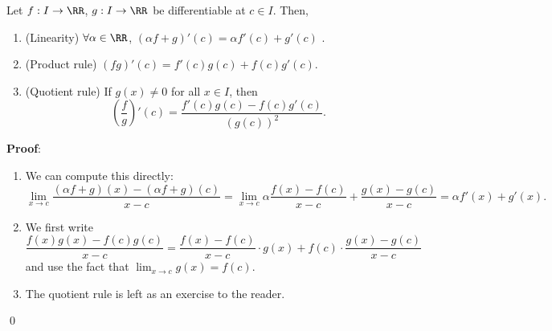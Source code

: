 \begin{theorem}
Let $f: I \to \RR$, $g:I\to \RR$ be differentiable at $c\in I$. Then,
\begin{enumerate}
    \item (Linearity) $\forall \alpha \in \RR$, $(\alpha f+g)'(c) = \alpha f'(c) + g'(c)$ .
    \item (Product rule) $(fg)'(c) = f'(c)g(c) + f(c)g'(c)$.
    \item (Quotient rule) If $g(x)\neq 0$ for all $x\in I$, then 
    \[
    \left(\frac{f}{g}\right)'(c) = \frac{f'(c)g(c) - f(c)g'(c)}{(g(c))^2}.
    \]
\end{enumerate}
\end{theorem}
\textbf{Proof}:
\begin{enumerate}
    \item We can compute this directly:
    \[
    \lim_{x\to c} \frac{(\alpha f+g)(x) - (\alpha f + g)(c)}{x-c}= \lim_{x\to c} \alpha \frac{f(x) -f(c)}{x-c} + \frac{g(x) -g(c)}{x-c} = \alpha f'(x) + g'(x).
    \]
    \item We first write
    \[
    \frac{f(x) g(x) - f(c)g(c)}{x-c} = \frac{f(x)-f(c)}{x-c}\cdot g(x) + f(c) \cdot \frac{g(x)-g(c)}{x-c}
    \]
    and use the fact that $\lim_{x\to c}g(x) = f(c)$.
    \item The quotient rule is left as an exercise to the reader.
\end{enumerate} \qed 

